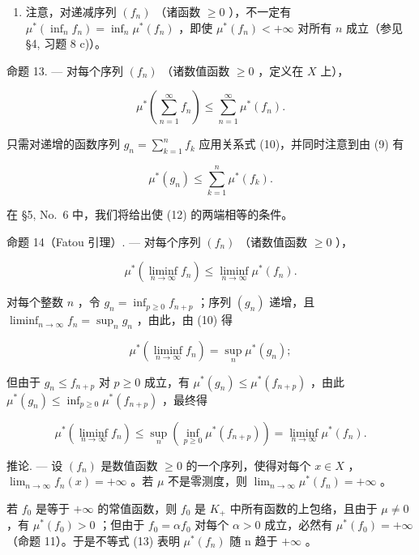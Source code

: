\begin{enumerate}
\def\labelenumi{\arabic{enumi})}
\setcounter{enumi}{1}
\tightlist
\item
  注意，对递减序列 \((f_n)\) （诸函数 \(\geqslant 0\) ），不一定有 \(\mu^{*}(\inf_{n} f_n) = \inf_{n} \mu^{*}(f_n)\) ，即使 \(\mu^{*}(f_n) < +\infty\) 对所有 \(n\) 成立（参见 §4, 习题 8 c)）。
\end{enumerate}

命题 13. --- 对每个序列 \((f_n)\) （诸数值函数 \(\geqslant 0\) ，定义在 \(X\) 上），

\[
\mu^ {*} \left(\sum_ {n = 1} ^ {\infty} f _ {n}\right) \leqslant \sum_ {n = 1} ^ {\infty} \mu^ {*} (f _ {n}).\tag{12}
\]

只需对递增的函数序列 \(g_{n} = \sum_{k=1}^{n} f_{k}\) 应用关系式 (10)，并同时注意到由 (9) 有

\[
\mu^ {*} (g _ {n}) \leqslant \sum_ {k = 1} ^ {n} \mu^ {*} (f _ {k}).
\]

在 §5, No.~6 中，我们将给出使 (12) 的两端相等的条件。

命题 14（Fatou 引理）. --- 对每个序列 \((f_{n})\) （诸数值函数 \(\geqslant 0\) ），

\[
\mu^ {*} \left(\liminf _ {n \to \infty} f _ {n}\right) \leqslant \liminf _ {n \to \infty} \mu^ {*} (f _ {n})  .\tag{13}
\]

对每个整数 \(n\) ，令 \(g_{n} = \inf_{p\geqslant 0}f_{n + p}\) ；序列 \((g_n)\) 递增，且 \(\liminf_{n\to \infty}f_n = \sup_n g_n\) ，由此，由 (10) 得

\[
\mu^ {*} (\liminf _ {n \to \infty} f _ {n}) = \sup _ {n} \mu^ {*} (g _ {n});
\]

但由于 \(g_{n} \leqslant f_{n+p}\) 对 \(p \geqslant 0\) 成立，有 \(\mu^{*}(g_{n}) \leqslant \mu^{*}(f_{n+p})\) ，由此 \(\mu^{*}(g_{n}) \leqslant \inf_{p \geqslant 0} \mu^{*}(f_{n+p})\) ，最终得

\[
\mu^ {*} \left(\operatorname * {l i m i n f} _ {n \to \infty} f _ {n}\right) \leqslant \sup _ {n} \left(\inf _ {p \geqslant 0} \mu^ {*} (f _ {n + p})\right) = \operatorname * {l i m i n f} _ {n \to \infty} \mu^ {*} (f _ {n}).
\]

推论. --- 设 \((f_{n})\) 是数值函数 \(\geqslant0\) 的一个序列，使得对每个 \(x\in X\) ，\(\lim_{n\to\infty}f_{n}(x)=+\infty\) 。若 \(\mu\) 不是零测度，则 \(\lim_{n\to\infty}\mu^{*}(f_{n})=+\infty\) 。

若 \(f_{0}\) 是等于 \(+\infty\) 的常值函数，则 \(f_{0}\) 是 \(K_{+}\) 中所有函数的上包络，且由于 \(\mu \neq 0\) ，有 \(\mu^{*}(f_{0}) > 0\) ；但由于 \(f_{0} = \alpha f_{0}\) 对每个 \(\alpha > 0\) 成立，必然有 \(\mu^{*}(f_{0}) = +\infty\) （命题 11）。于是不等式 (13) 表明 \(\mu^{*}(f_{n})\) 随 n 趋于 \(+\infty\) 。

